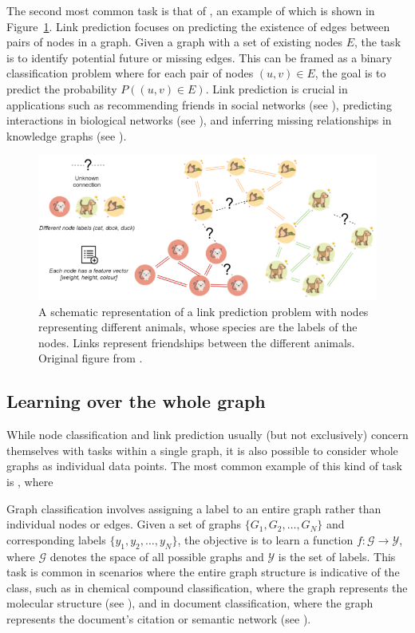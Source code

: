 The second most common task is that of , an example of which is shown in Figure~\ref{fig:link-prediction}. Link prediction focuses on predicting the existence of edges between pairs of nodes in a graph. Given a graph with a set of existing nodes \( E \), the task is to identify potential future or missing edges. This can be framed as a binary classification problem where for each pair of nodes \( (u, v) \in E \), the goal is to predict the probability \( P((u, v) \in E) \). Link prediction is crucial in applications such as recommending friends in social networks (see \cite{wang_link_2015}), predicting interactions in biological networks (see \cite{zhang_graph_2021}), and inferring missing relationships in knowledge graphs (see \cite{bordes_translating_2013}).

\begin{figure}
	\includegraphics[width=\linewidth]{images/graph-tasks/link-prediction.png}
	\caption{A schematic representation of a link prediction problem with nodes representing different animals, whose species are the labels of the nodes. Links represent friendships between the different animals. Original figure from \cite{kubara_machine_2020}.}
	\label{fig:link-prediction}
\end{figure}

\subsection{Learning over the whole graph}

While node classification and link prediction usually (but not exclusively) concern themselves with tasks within a single graph, it is also possible to consider whole graphs as individual data points. The most common example of this kind of task is , where 

Graph classification involves assigning a label to an entire graph rather than individual nodes or edges. Given a set of graphs \( \{G_1, G_2, \ldots, G_N\} \) and corresponding labels \( \{y_1, y_2, \ldots, y_N\} \), the objective is to learn a function \( f: \mathcal{G} \rightarrow \mathcal{Y} \), where \( \mathcal{G} \) denotes the space of all possible graphs and \( \mathcal{Y} \) is the set of labels. This task is common in scenarios where the entire graph structure is indicative of the class, such as in chemical compound classification, where the graph represents the molecular structure (see \cite{duvenaud_convolutional_2015}), and in document classification, where the graph represents the document's citation or semantic network (see \cite{zhang_every_2020}).

